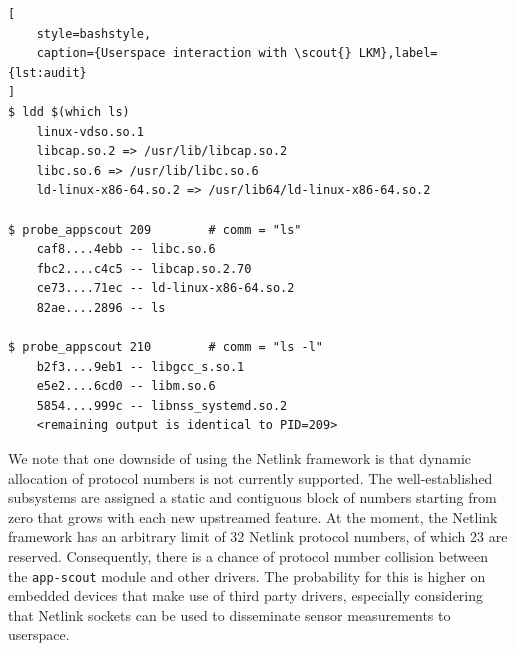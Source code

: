 \begin{lstlisting}[
    style=bashstyle,
    caption={Userspace interaction with \scout{} LKM},label={lst:audit}
]
$ ldd $(which ls)
    linux-vdso.so.1
    libcap.so.2 => /usr/lib/libcap.so.2
    libc.so.6 => /usr/lib/libc.so.6
    ld-linux-x86-64.so.2 => /usr/lib64/ld-linux-x86-64.so.2

$ probe_appscout 209        # comm = "ls"
    caf8....4ebb -- libc.so.6
    fbc2....c4c5 -- libcap.so.2.70
    ce73....71ec -- ld-linux-x86-64.so.2
    82ae....2896 -- ls

$ probe_appscout 210        # comm = "ls -l"
    b2f3....9eb1 -- libgcc_s.so.1
    e5e2....6cd0 -- libm.so.6
    5854....999c -- libnss_systemd.so.2
    <remaining output is identical to PID=209>
\end{lstlisting}

We note that one downside of using the Netlink framework is that dynamic allocation of protocol numbers is not currently supported. The well-established subsystems are assigned a static and contiguous block of numbers starting from zero that grows with each new upstreamed feature. At the moment, the Netlink framework has an arbitrary limit of 32 Netlink protocol numbers, of which 23 are reserved. Consequently, there is a chance of protocol number collision between the \texttt{app-scout} module and other drivers. The probability for this is higher on embedded devices that make use of third party drivers, especially considering that Netlink sockets can be used to disseminate sensor measurements to userspace.
